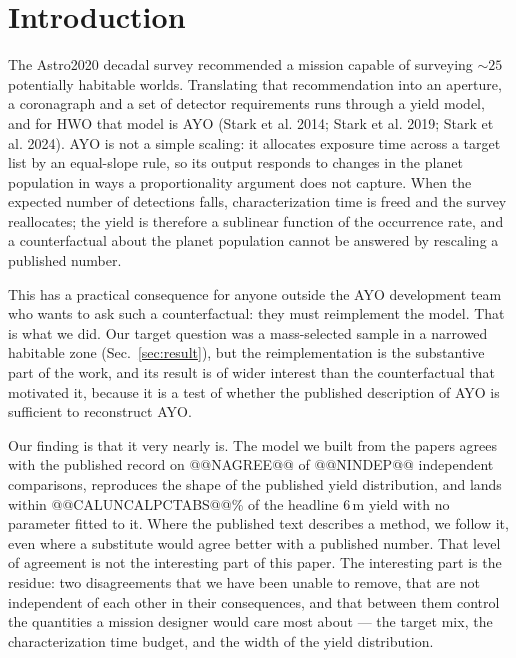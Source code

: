 \documentclass[11pt,a4paper]{article}
\begin{document}
\tableofcontents

\section{Introduction}

The Astro2020 decadal survey recommended a mission capable of surveying $\sim25$ potentially
habitable worlds. Translating that recommendation into an aperture, a coronagraph and a set of
detector requirements runs through a yield model, and for HWO that model is AYO
(Stark et al. 2014; Stark et al. 2019; Stark et al. 2024). AYO is not a simple scaling: it allocates exposure time
across a target list by an equal-slope rule, so its output responds to changes in the planet
population in ways a proportionality argument does not capture. When the expected number of
detections falls, characterization time is freed and the survey reallocates; the yield is
therefore a sublinear function of the occurrence rate, and a counterfactual about the planet
population cannot be answered by rescaling a published number.

This has a practical consequence for anyone outside the AYO development team who wants to ask
such a counterfactual: they must reimplement the model. That is what we did. Our target question
was a mass-selected sample in a narrowed habitable zone (Sec.~\ref{sec:result}), but the
reimplementation is the substantive part of the work, and its result is of wider interest than
the counterfactual that motivated it, because it is a test of whether the published description
of AYO is sufficient to reconstruct AYO.

Our finding is that it very nearly is. The model we built from the papers agrees with the
published record on @@NAGREE@@ of @@NINDEP@@ independent comparisons, reproduces the shape of the
published yield distribution, and lands within @@CALUNCALPCTABS@@\% of the headline $6\,$m yield
with no parameter fitted to it. Where the published text describes a method, we follow it, even
where a substitute would agree better with a published number. That level of agreement is not the interesting part of this paper.
The interesting part is the residue: two disagreements that we have been unable to remove, that
are not independent of each other in their consequences, and that between them control the
quantities a mission designer would care most about --- the target mix, the characterization time
budget, and the width of the yield distribution.
\end{document}
